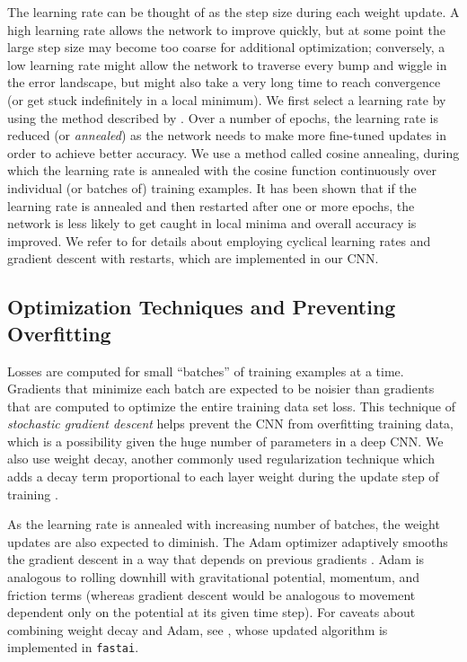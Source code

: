 \documentclass[fleqn,usenatbib]{mnras}
\begin{document}
The learning rate can be thought of as the step size during each weight update.
A high learning rate allows the network to improve quickly, but at some point the large step size may become too coarse for additional optimization; conversely, a low learning rate might allow the network to traverse every bump and wiggle in the error landscape, but might also take a very long time to reach convergence (or get stuck indefinitely in a local minimum).
We first select a learning rate by using the method described by \cite{CLR}.
Over a number of epochs, the learning rate is reduced (or \textit{annealed}) as the network needs to make more fine-tuned updates in order to achieve better accuracy.
We use a method called cosine annealing, during which the learning rate is annealed with the cosine function continuously over individual (or batches of) training examples.
It has been shown that if the learning rate is annealed and then restarted after one or more epochs, the network is less likely to get caught in local minima and overall accuracy is improved.
We refer to \cite{SGDR} for details about employing cyclical learning rates and gradient descent with restarts, which are implemented in our CNN.

\subsection{Optimization Techniques and Preventing Overfitting} \label{sec:optimization}

Losses are computed for small ``batches'' of training examples at a time.
Gradients that minimize each batch are expected to be noisier than gradients that are computed to optimize the entire training data set loss.
This technique of \textit{stochastic gradient descent} helps prevent the CNN from overfitting training data, which is a possibility given the huge number of parameters in a deep CNN.
We also use weight decay, another commonly used regularization technique which adds a decay term proportional to each layer weight during the update step of training .

As the learning rate is annealed with increasing number of batches, the weight updates are also expected to diminish.
The Adam optimizer adaptively smooths the gradient descent in a way that depends on previous gradients \citep{Kingma2014}.
Adam is analogous to rolling downhill with gravitational potential, momentum, and friction terms (whereas gradient descent would be analogous to movement dependent only on the potential at its given time step).
For caveats about combining weight decay and Adam, see \cite{Loshchilov2017}, whose updated algorithm is implemented in \texttt{fastai}.
\end{document}
